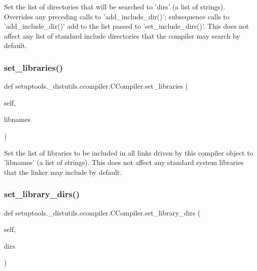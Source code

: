 \begin{DoxyVerb}Set the list of directories that will be searched to 'dirs' (a
list of strings).  Overrides any preceding calls to
'add_include_dir()'; subsequence calls to 'add_include_dir()' add
to the list passed to 'set_include_dirs()'.  This does not affect
any list of standard include directories that the compiler may
search by default.
\end{DoxyVerb}
 \mbox{\label{classsetuptools_1_1__distutils_1_1ccompiler_1_1CCompiler_a94b8d789373ef12107bc88bf86f49889}} 
\subsubsection{\texorpdfstring{set\+\_\+libraries()}{set\_libraries()}}
{\footnotesize\ttfamily def setuptools.\+\_\+distutils.\+ccompiler.\+C\+Compiler.\+set\+\_\+libraries (\begin{DoxyParamCaption}\item[{}]{self,  }\item[{}]{libnames }\end{DoxyParamCaption})}

\begin{DoxyVerb}Set the list of libraries to be included in all links driven by
this compiler object to 'libnames' (a list of strings).  This does
not affect any standard system libraries that the linker may
include by default.
\end{DoxyVerb}
 \mbox{\label{classsetuptools_1_1__distutils_1_1ccompiler_1_1CCompiler_a4a339b31df17b10c026550ead20f6e08}} 
\subsubsection{\texorpdfstring{set\+\_\+library\+\_\+dirs()}{set\_library\_dirs()}}
{\footnotesize\ttfamily def setuptools.\+\_\+distutils.\+ccompiler.\+C\+Compiler.\+set\+\_\+library\+\_\+dirs (\begin{DoxyParamCaption}\item[{}]{self,  }\item[{}]{dirs }\end{DoxyParamCaption})}


